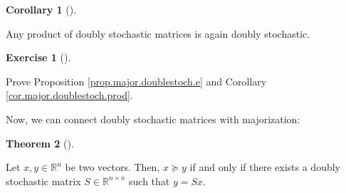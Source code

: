 \documentclass[numbers=enddot,12pt,final,onecolumn,notitlepage]{scrartcl}%
\newcounter{exer}
\numberwithin{exer}{subsection}
\theoremstyle{definition}
\newtheorem{theo}{Theorem}[subsection]
\newenvironment{theorem}[1][]
{\begin{theo}[#1]\begin{leftbar}}
{\end{leftbar}\end{theo}}
\newtheorem{coro}[theo]{Corollary}
\newenvironment{corollary}[1][]
{\begin{coro}[#1]\begin{leftbar}}
{\end{leftbar}\end{coro}}
\newtheorem{exmp}[exer]{Exercise}
\newenvironment{exercise}[1][]
{\begin{exmp}[#1]\begin{leftbar}}
{\end{leftbar}\end{exmp}}
\begin{document}
\begin{corollary}
\label{cor.major.doublestoch.prod}Any product of doubly stochastic matrices is
again doubly stochastic.
\end{corollary}

\begin{exercise}
 Prove Proposition \ref{prop.major.doublestoch.e} and Corollary
\ref{cor.major.doublestoch.prod}.
\end{exercise}

Now, we can connect doubly stochastic matrices with majorization:

\begin{theorem}
\label{thm.major.doublestoch.maj}Let $x,y\in\mathbb{R}^{n}$ be two vectors.
Then, $x\succcurlyeq y$ if and only if there exists a doubly stochastic matrix
$S\in\mathbb{R}^{n\times n}$ such that $y=Sx$.
\end{theorem}
\end{document}
